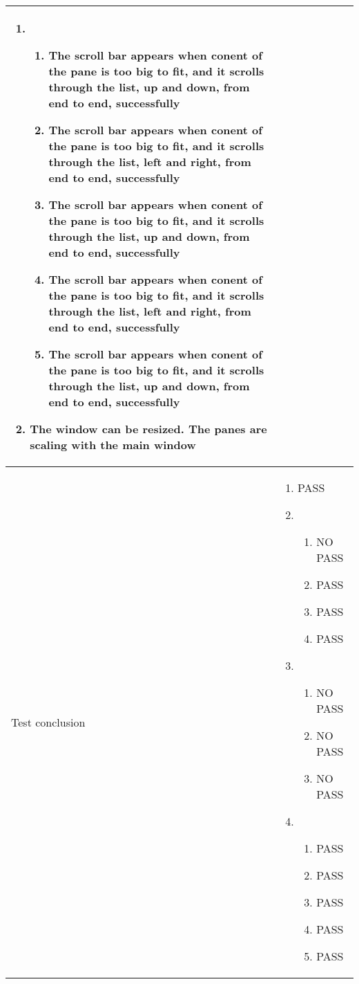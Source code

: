\begin{center}
\begin{longtable}{ | p{4cm} | p{10cm} | }
\begin{enumerate}
							\item 
							\begin{enumerate}
								\item The scroll bar appears when conent of the pane is too big to fit, and it scrolls through the list, up and down, from end to end, successfully
								\item The scroll bar appears when conent of the pane is too big to fit, and it scrolls through the list, left and right, from end to end, successfully
								\item The scroll bar appears when conent of the pane is too big to fit, and it scrolls through the list, up and down, from end to end, successfully		
								\item The scroll bar appears when conent of the pane is too big to fit, and it scrolls through the list, left and right, from end to end, successfully
								\item The scroll bar appears when conent of the pane is too big to fit, and it scrolls through the list, up and down, from end to end, successfully
							\end{enumerate}

							\item The window can be resized. The panes are scaling with the main window
						\end{enumerate}
							\\ [3pt] \hline

			Test conclusion & 	\begin{enumerate}
							\item PASS

							\item  
							\begin{enumerate}
								\item NO PASS
								\item PASS
								\item PASS
								\item PASS
							\end{enumerate}
							
							\item
							\begin{enumerate}
								\item NO PASS
								\item NO PASS
								\item NO PASS
							\end{enumerate}

							\item 
							\begin{enumerate}																							\item PASS
								\item PASS
								\item PASS
								\item PASS
								\item PASS
							\end{enumerate}


\end{enumerate}
\end{longtable}
\end{center}
